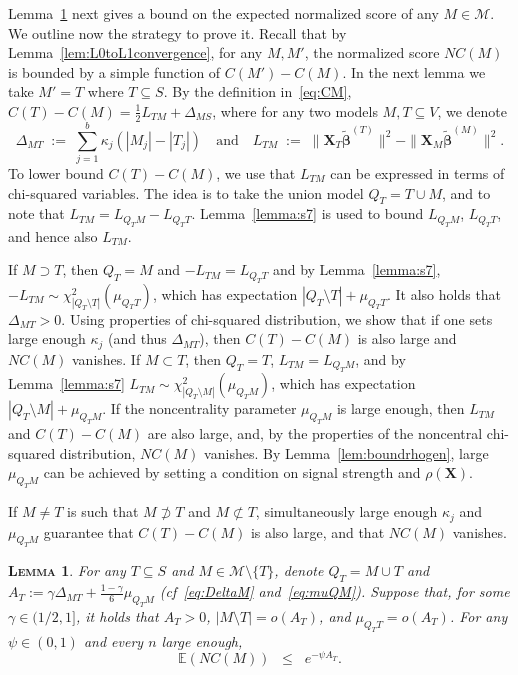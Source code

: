 \documentclass[
  12pt]{article}
\newcommand{\E}{\mathbb{E}}
\newcommand{\M}{\mathcal{M}}
\newcommand{\bbeta}{\boldsymbol{\beta}}
\newcommand{\bX}{\mathbf{X}}
\newtheorem{lem}[thm]{\textsc{Lemma}}
\begin{document}
Lemma~\ref{lem:boundexpnc} next gives a bound on the expected normalized score of any $M \in \M$. We outline now the strategy to prove it. Recall that by Lemma~\ref{lem:L0toL1convergence}, for any $M,M'$, the normalized score $NC(M)$ is bounded by a simple function of $C(M')-C(M)$. In the next lemma we take $M'= T$ where $T\subseteq S$. By the definition in~\eqref{eq:CM}, $C(T)-C(M)=\tfrac12 L_{TM}+\Delta_{MS}$, where for any two models $M,T\subseteq V$, we denote
\begin{equation}\label{eq:DeltaM}
\Delta_{MT}\;:=\;\sum_{j=1}^b \kappa_j(|M_j|-|T_j|) \quad\text{and} \quad L_{TM}\;:=\;\|\bX_{T}\tilde{\bbeta}^{(T)}\|^2-\|\bX_{M}\tilde{\bbeta}^{(M)}\|^2.
\end{equation}
To lower bound $C(T)-C(M)$, we use that $L_{TM}$ can be expressed in terms of chi-squared variables.
The idea is to take the union model $Q_T=T\cup M$, and to note that $L_{TM}=L_{Q_TM}-L_{Q_TT}$. Lemma~\ref{lemma:s7} is used to bound $L_{Q_TM}$, $L_{Q_TT}$, and hence also $L_{TM}$.

If $M\supset T$, then $Q_T=M$ and $-L_{TM}=L_{Q_TT}$ and by Lemma~\ref{lemma:s7}, $-L_{TM}\sim \chi^2_{|Q_T\setminus T|}(\mu_{Q_TT})$, which has expectation $|Q_T\setminus T|+\mu_{Q_TT}$. It also holds that $\Delta_{MT}>0$. Using properties of chi-squared distribution, we show that if one sets large enough $\kappa_j$ (and thus $\Delta_{MT}$), then $C(T)-C(M)$ is also large and $NC(M)$ vanishes. If $M\subset T$, then $Q_T=T$, $L_{TM}=L_{Q_TM}$, and by Lemma~\ref{lemma:s7}
$L_{TM}\sim \chi^2_{|Q_T\setminus M|}(\mu_{Q_TM})$, which has expectation $|Q_T\setminus M|+\mu_{Q_TM}$.
If the noncentrality parameter $\mu_{Q_TM}$ is large enough, then $L_{TM}$ and $C(T)-C(M)$ are also large, and, by the properties of the noncentral chi-squared distribution, $NC(M)$ vanishes. By Lemma~\ref{lem:boundrhogen}, large $\mu_{Q_TM}$ can be achieved by setting a condition on signal strength and $\rho(\bX)$.

If $M\neq T$ is such that $M\not\supset T$ and $M\not\subset T$, simultaneously large enough $\kappa_j$ and $\mu_{Q_T M}$ guarantee that $C(T)-C(M)$ is also large, and that $NC(M)$ vanishes.

\begin{lem}\label{lem:boundexpnc} For any $T\subseteq S$ and $M\in \M\setminus\{T\}$, denote $Q_T= M\cup T$ and $A_T:=\gamma\Delta_{MT}+\tfrac{1-\gamma}{6}\mu_{Q_TM}$ (\emph{cf}~\eqref{eq:DeltaM} and~\eqref{eq:muQM}). Suppose that, for some $\gamma \in (1/2,1]$, it holds that $A_T>0$, $|M\setminus T|=o(A_T)$, and $\mu_{Q_T T}=o(A_T)$. For any $\psi\in(0,1)$ and every $n$ large enough,
$$\E\left(NC(M)\right)  \;\;\leq\;\; e^{-\psi A_T}.$$
\end{lem}
\end{document}
